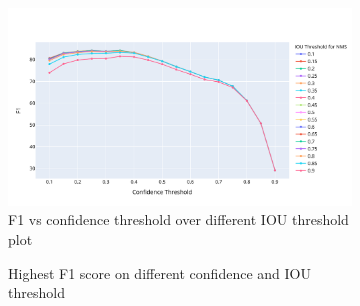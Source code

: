 \begin{figure}[htbp]
  \centering
 
  \begin{subfigure}{1.0\textwidth}
    \includegraphics[width=\linewidth]{img/F1_vs_conf_plot.pdf}
    \caption{F1 vs confidence threshold over different IOU threshold plot}
    \label{fig:F1_vs_conf_plot}
  \end{subfigure}
 
    \bigskip
 
   \begin{subfigure}{1.0\linewidth}
    \centering
    \caption{Highest F1 score on different confidence and IOU threshold}
    \label{fig:F1_vs_conf_table}
  \end{subfigure}
  

  \caption{}
  \label{fig:F1_vs_conf} %
\end{figure}